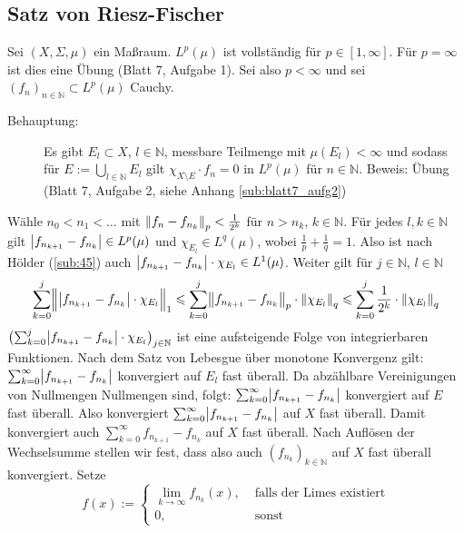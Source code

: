 \subsection{Satz von Riesz-Fischer} %
\label{sub:411}
Sei $(X,\Sigma,\mu)$ ein Maßraum. $L^p(\mu)$ ist vollständig für $p \in [1,\infty]$.
Für $p=\infty$ ist dies eine Übung (Blatt 7, Aufgabe 1). Sei also $p <\infty$ und sei $(f_n)_{n \in \mathds{N}} \subset L^p(\mu)$ Cauchy.
\begin{description}
	\item[Behauptung:] Es gibt $E_l \subset X$, $l \in \mathds{N}$, messbare Teilmenge mit $\mu(E_l) <\infty$ und sodass für $E := \bigcup_{l \in \mathds{N}} E_l$ gilt 
	$\chi_{X \setminus E} \cdot f_n = 0$ in $L^p(\mu)$ für $n \in \mathds{N}$. Beweis: Übung (Blatt 7, Aufgabe 2, siehe Anhang \ref{sub:blatt7_aufg2})
\end{description}
Wähle $n_0 < n_1 < \ldots $ mit $\norm[p]{f_n - f_{n_k}} < \frac{1}{2^k}$ für $n > n_k$, $k \in \mathds{N}$. Für jedes $l,k \in \mathds{N}$ gilt
$\abs*{f_{n_{k+1}} - f_{n_k}} \in L^p(\mu)$ und $\chi_{E_l} \in L^q(\mu)$, wobei $\frac{1}{p} + \frac{1}{q}=1$. Also ist nach Hölder (\ref{sub:45}) auch
\(
	\abs*{f_{n_{k+1}} - f_{n_k}} \cdot \chi_{E_l} \in L^1(\mu)
\).
Weiter gilt für $j \in \mathds{N}$, $l \in \mathds{N}$
\[
	\sum_{k=0}^{j}  \doppelstrich[\Big]{\abs*{f_{n_{k+1}}- f_{n_k}} \cdot \chi_{E_l}}_{1}
	\le \sum_{k=0}^{j} \norm[p]{f_{n_{k+1}}- f_{n_k}} \cdot \norm[q]{\chi_{E_l}} \le \sum_{k=0}^{j} \frac{1}{2^k} \cdot \norm[q]{\chi_{E_l}}
\]
$\enbrace[\big]{\sum_{k=0}^{j} \abs*{f_{n_{k+1}} - f_{n_k}} \cdot \chi_{E_l}}_{j \in \mathds{N}}$ ist eine aufsteigende Folge von integrierbaren Funktionen. Nach dem Satz von
Lebesgue über monotone Konvergenz gilt: $\sum_{k=0}^{\infty} \abs*{f_{n_{k+1}} - f_{n_k}} $ konvergiert auf $E_l$ fast überall. Da abzählbare Vereinigungen von Nullmengen
Nullmengen sind, folgt: $\sum_{k=0}^{\infty} \abs*{f_{n_{k+1}}- f_{n_k}}$ konvergiert auf $E$ fast überall. Also konvergiert $\sum_{k=0}^{\infty} \abs*{f_{n_{k+1}}- f_{n_k}}$
auf $X$ fast überall. Damit konvergiert auch $\sum_{k=0}^{\infty} f_{n_{k+1}}- f_{n_k}$ auf $X$ fast überall. Nach Auflösen der Wechselsumme stellen wir fest, dass also
auch $(f_{n_k})_{k \in \mathds{N}}$ auf $X$ fast überall konvergiert. Setze
\[
	f(x) := \begin{cases}
		\lim_{k\to \infty} f_{n_k}(x), &\text{ falls der Limes existiert}\\
		0, &\text{ sonst}
	\end{cases}
\]
